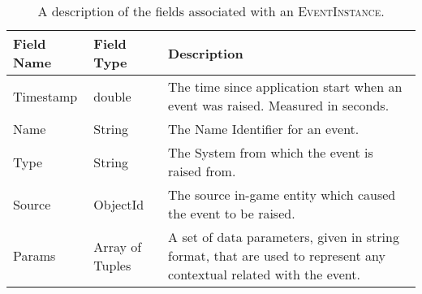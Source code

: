 
\begin{table}
    \begin{center}
      \caption{A description of the fields associated with an \textsc{EventInstance}.}
      \label{tab:event-instance}
      \begin{tabular}{ >{\small}w{l}{5em} m{7em} m{16em} } %
        \addlinespace
        \toprule
        \bf Field Name & \bf Field Type  & \bf Description \\
        \midrule
        Timestamp      & double          & The time since application start when an event was 
                                           raised. Measured in seconds.                        \\
        Name           & String          & The Name Identifier for an event.                   \\
        Type           & String          & The System from which the event is raised from.     \\
        Source         & ObjectId        & The source in-game entity which caused the event to 
                                           be raised.                                          \\
        Params         & Array of Tuples & A set of data parameters, given in string format,  
                                           that are used to represent any contextual related 
                                           with the event.                                     \\
        \bottomrule
      \end{tabular}
    \end{center}
\end{table}
